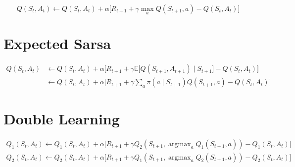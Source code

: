 \documentclass{article}
\DeclareMathOperator*{\argmax}{argmax}
\begin{document}
        \begin{equation}
            Q(S_t, A_t) \leftarrow Q(S_t, A_t) + \alpha \Big[ R_{t+1} + \gamma \max_{a} Q(S_{t+1}, a) - Q(S_t, A_t) \Big]
        \end{equation}
    
    \section{Expected Sarsa}
    
        \begin{equation}
        \begin{split}
            Q(S_t, A_t) & \leftarrow Q(S_t, A_t) + \alpha \Big[ R_{t+1} + \gamma \mathbb{E} \big[ Q(S_{t+1}, A_{t+1}) \mid S_{t+1} \big] - Q(S_t, A_t) \Big] \\
            & \leftarrow Q(S_t, A_t) + \alpha \Big[ R_{t+1} + \gamma \sum_a \pi(a \mid S_{t+1}) Q(S_{t+1},a) - Q(S_t, A_t) \Big]
        \end{split}
        \end{equation}
        
    \section{Double Learning}
    
        \begin{equation}
        \begin{split}
            Q_{1}(S_t, A_t) \leftarrow Q_{1}(S_t, A_t) + \alpha \Big[ R_{t+1} + \gamma Q_{2}(S_{t+1}, \argmax_a Q_{1}(S_{t+1}, a)) - Q_{1}(S_t, A_t) \Big] \\
            Q_{2}(S_t, A_t) \leftarrow Q_{2}(S_t, A_t) + \alpha \Big[ R_{t+1} + \gamma Q_{1}(S_{t+1}, \argmax_a Q_{2}(S_{t+1}, a)) - Q_{2}(S_t, A_t) \Big]
        \end{split}
        \end{equation}
    
    
\end{document}
